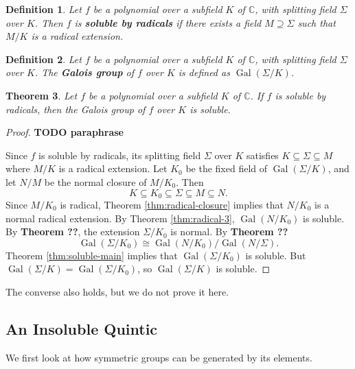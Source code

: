 \documentclass[12pt]{article}
\newtheorem{theorem}{Theorem}
\newtheorem{definition}[theorem]{Definition}
\newcommand{\Gal}{\operatorname{Gal}}
\begin{document}
\begin{definition}
    Let $f$ be a polynomial over a subfield $K$ of $\mathbb{C}$, with splitting
    field $\Sigma$ over $K$. Then $f$ is \textbf{soluble by radicals} if there
    exists a field $M \supseteq \Sigma$ such that $M / K$ is a radical
    extension.
\end{definition}

\begin{definition}
    Let $f$ be a polynomial over a subfield $K$ of $\mathbb{C}$, with splitting
    field $\Sigma$ over $K$. The \textbf{Galois group} of $f$ over $K$ is
    defined
    as $\Gal(\Sigma / K)$.
\end{definition}

\begin{theorem} \label{thm:radical-galois-soluble}
    Let $f$ be a polynomial over a subfield $K$ of $\mathbb{C}$. If $f$ is
    soluble by radicals, then the Galois group of $f$ over $K$ is soluble.
\end{theorem}

\begin{proof}
    \textbf{TODO paraphrase}

    Since $f$ is soluble by radicals, its splitting field $\Sigma$ over $K$
    satisfies $K \subseteq \Sigma \subseteq M$ where $M / K$ is a radical
    extension. Let $K_0$ be the fixed field of $\Gal(\Sigma / K)$, and let $N /
        M$
    be the normal closure of $M / K_0$. Then
    $$
        K \subseteq K_0 \subseteq \Sigma \subseteq M \subseteq N.
    $$
    Since $M / K_0$ is radical, Theorem \ref{thm:radical-closure} implies that
    $N /
        K_0$ is a normal radical extension. By Theorem \ref{thm:radical-3},
    $\Gal\left(N / K_0\right)$ is soluble.
    By \textbf{Theorem ??}, the extension $\Sigma / K_0$ is normal. By
    \textbf{Theorem ??}
    $$
        \Gal\left(\Sigma / K_0\right) \cong \Gal\left(N / K_0\right) / \Gal(N /
        \Sigma).
    $$
    Theorem \ref{thm:soluble-main} implies that $\Gal\left(\Sigma / K_0\right)$
    is
    soluble. But $\Gal(\Sigma / K)=\Gal\left(\Sigma / K_0\right)$, so
    $\Gal(\Sigma
        / K)$ is soluble.

\end{proof}

The converse also holds, but we do not prove it here.

\subsection{An Insoluble Quintic}
We first look at how symmetric groups can be generated by its elements.
\end{document}
